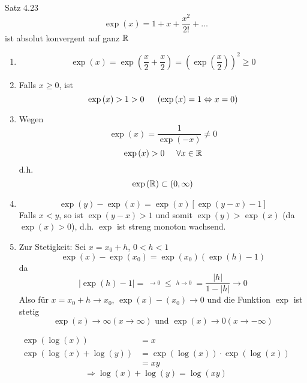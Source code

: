 \begin{beweis}{Satz 4.23}
\[\exp \left( x \right) = 1 + x + \frac{{{x^2}}}{{2!}} +  \ldots \]
ist absolut konvergent auf ganz $\mathbb{R}$
\begin{enumerate}
\item \[\exp \left( x \right) = \exp \left( {\frac{x}{2} + \frac{x}{2}} \right) = {\left( {\exp \left( {\frac{x}{2}} \right)} \right)^2} \ge 0\]
\item Falls $x\geq 0$, ist \[\exp \left( x \right) > 1 > 0\hspace{5mm}\left( {\exp \left( x \right) = 1 \Leftrightarrow x = 0} \right)\]
\item Wegen \[\exp \left( x \right) = \frac{1}{{\exp \left( { - x} \right)}}\not  = 0\] \[\exp \left( x \right) > 0\hspace{5mm}\forall x \in \mathbb{R}\] d.h. \[\exp\left( \mathbb{R}\right)\subset\left( 0,\infty\right)\]
\item \[\exp \left( y \right) - \exp \left( x \right) = \exp \left( x \right)\left[ {\exp \left( {y - x} \right) - 1} \right]\]
Falls $x<y$, so ist $\exp\left(y-x\right)>1$ und somit $\exp\left(y\right)>\exp\left(x\right)$ (da $\exp\left(x\right)>0$), d.h. $\exp$ ist streng monoton wachsend.
\item Zur Stetigkeit: Sei $x=x_0+h$, $0<h<1$
\[\exp \left( x \right) - \exp \left( {{x_0}} \right) = \exp \left( {{x_0}} \right)\left( {\exp \left( h \right) - 1} \right)\]
da
\[\left| {\exp \left( h \right) - 1} \right| = \mathop {\left| {\sum\limits_{k = 1}^\infty  {\frac{{{h^k}}}{{k!}}} } \right|}\limits^{ \to 0}  \le \mathop {\left| {\sum\limits_{k = 1}^\infty  {\left| {{h^k}} \right|} } \right|}\limits^{h \to 0}  = \frac{{\left| h \right|}}{{1 - \left| h \right|}} \to 0\]
Also für $x=x_0+h\to x_0$, $\exp\left( x \right)-\left( x_0 \right)\to 0$ und die Funktion $\exp$ ist stetig
\[\exp \left( x \right) \to \infty \left( {x \to \infty } \right){\text{ und }}\exp \left( x \right) \to 0\left( {x \to  - \infty } \right)\]
\end{enumerate}
\end{beweis}

\begin{align*}
\exp\left( \log(x)\right)&=x\\
\exp\left( \log\left(x\right)+\log\left(y\right)\right)&=\exp\left( \log\left(x\right)\right)\cdot\exp\left( \log\left(x\right)\right)\\
&=xy
\end{align*}
\[ \Rightarrow\boxed{\log\left( x\right)+\log\left( y\right)=\log\left( xy\right)}\]

